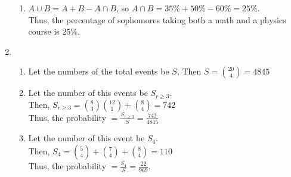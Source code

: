 \documentclass{article}
\begin{document}
\begin{enumerate}
\begin{enumerate}
            \item 
            $A \cup B = A + B - A \cap B$, so $A \cap B = 35\% + 50\% - 60\% = 25\%$.\\
            Thus, the percentage of sophomores taking both a math and a physics course is $25\%$.
        \end{enumerate}
        \item 
        \begin{enumerate}
            \item[]
            Let the numbers of the total events be $S$, Then $S = \binom{20}{4} = 4845$
            \item 
            Let the number of this events be $S_{r \geqslant 3}$.\\
            Then, $S_{r \geqslant 3} = \binom{8}{3} \binom{12}{1} + \binom{8}{4} = 742$\\
            Thus, the probability $= \frac{S_{r \geqslant 3}}{S} = \frac{742}{4845}$
            \item
            Let the number of this event be $S_{4}$.\\
            Then, $S_{4} = \binom{5}{4} + \binom{7}{4} + \binom{8}{4} = 110$\\
            Thus, the probability $= \frac{S_{4}}{S} = \frac{22}{969}$.
        \end{enumerate}
    \end{enumerate}
\end{document}
